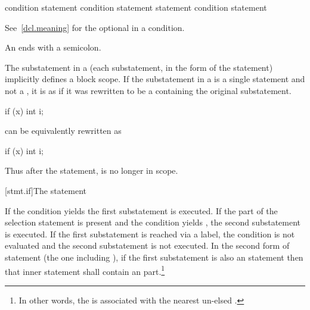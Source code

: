 %
%
%
\begin{bnf}
\br
      \terminal{(}  condition \terminal{)} statement\br
      \terminal{(}  condition \terminal{)} statement  statement\br
     \terminal{(}  condition \terminal{)} statement
\end{bnf}

See~\ref{dcl.meaning} for the optional  in a condition.
\begin{note}
An  ends with a semicolon.
\end{note}

\pnum
{}%
The substatement in a  (each substatement,
in the  form of the  statement) implicitly defines
a block scope. If the substatement in a
 is a single statement and not a
, it is as if it was rewritten to be a
 containing the original substatement.
\begin{example}

\begin{codeblock}
if (x)
  int i;
\end{codeblock}

can be equivalently rewritten as

\begin{codeblock}
if (x) {
  int i;
}
\end{codeblock}

Thus after the  statement,  is no longer in scope.
\end{example}

[stmt.if]{The  statement}%

\pnum
If the condition yields  the first
substatement is executed. If the  part of the selection
statement is present and the condition yields , the second
substatement is executed. If the first substatement is reached via a
label, the condition is not evaluated and the second substatement is
not executed. In the second form of  statement
(the one including ), if the first substatement is also an
 statement then that inner  statement shall contain
an  part.\footnote{In other words, the  is associated with the nearest un-elsed
.}

